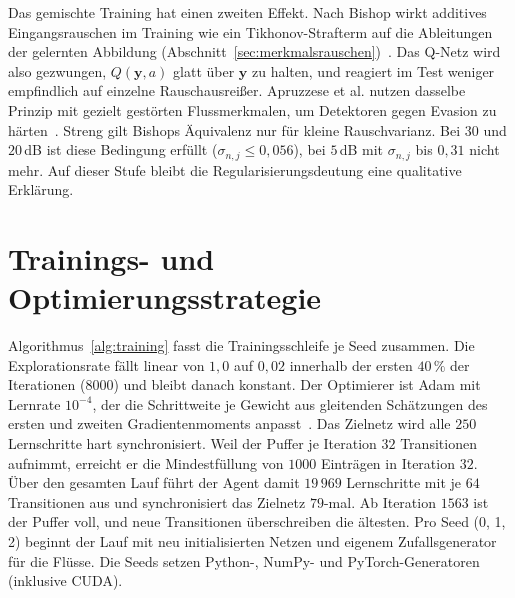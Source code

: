 Das gemischte Training hat einen zweiten Effekt. Nach Bishop wirkt additives Eingangsrauschen im Training wie ein Tikhonov-Strafterm auf die Ableitungen der gelernten Abbildung (Abschnitt~\ref{sec:merkmalsrauschen})~\autocite{bishopTrainingNoiseEquivalent1995}. Das Q-Netz wird also gezwungen, $Q(\mathbf{y},a)$ glatt über $\mathbf{y}$ zu halten, und reagiert im Test weniger empfindlich auf einzelne Rauschausreißer. Apruzzese et al. nutzen dasselbe Prinzip mit gezielt gestörten Flussmerkmalen, um Detektoren gegen Evasion zu härten~\autocite{apruzzeseDeepReinforcementAdversarial2020}. Streng gilt Bishops Äquivalenz nur für kleine Rauschvarianz. Bei $30$ und $20$\,dB ist diese Bedingung erfüllt ($\sigma_{n,j}\le0{,}056$), bei $5$\,dB mit $\sigma_{n,j}$ bis $0{,}31$ nicht mehr. Auf dieser Stufe bleibt die Regularisierungsdeutung eine qualitative Erklärung.

\section{Trainings- und Optimierungsstrategie}
\label{sec:training_optimierung}

Algorithmus~\ref{alg:training} fasst die Trainingsschleife je Seed zusammen. Die Explorationsrate fällt linear von $1{,}0$ auf $0{,}02$ innerhalb der ersten $40\,\%$ der Iterationen ($8000$) und bleibt danach konstant. Der Optimierer ist Adam mit Lernrate $10^{-4}$, der die Schrittweite je Gewicht aus gleitenden Schätzungen des ersten und zweiten Gradientenmoments anpasst~\autocite{kingmaAdamMethodStochastic2015}. Das Zielnetz wird alle $250$ Lernschritte hart synchronisiert. Weil der Puffer je Iteration $32$ Transitionen aufnimmt, erreicht er die Mindestfüllung von $1000$ Einträgen in Iteration $32$. Über den gesamten Lauf führt der Agent damit $19\,969$ Lernschritte mit je $64$ Transitionen aus und synchronisiert das Zielnetz $79$-mal. Ab Iteration $1563$ ist der Puffer voll, und neue Transitionen überschreiben die ältesten. Pro Seed (0, 1, 2) beginnt der Lauf mit neu initialisierten Netzen und eigenem Zufallsgenerator für die Flüsse. Die Seeds setzen Python-, NumPy- und PyTorch-Generatoren (inklusive CUDA).

